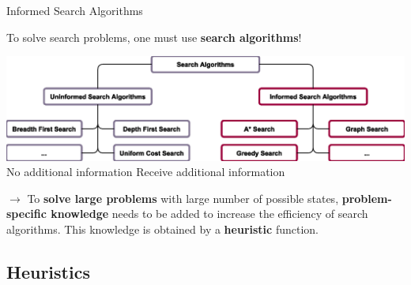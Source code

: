 \documentclass[9pt]{beamer}
\begin{document}
\begin{frame}{Informed Search Algorithms}
\begin{small}
\begin{center}
    To solve search problems, one must use \textbf{search algorithms}!
    
    \vspace{2mm}

    \includegraphics[keepaspectratio, width=1.00\textwidth]{images/search_algorithms.eps}\\
    \textcolor{CS-2}{No additional information} \hfill \textcolor{CS-1}{Receive additional information}
\end{center}

$\rightarrow$ To \textbf{solve large problems} with large number of possible states, \textbf{problem-specific knowledge} needs to be added to increase the efficiency of search algorithms. This knowledge is obtained by a \textbf{heuristic} function.
\end{small}
\end{frame}

\subsection{Heuristics}
\end{document}
